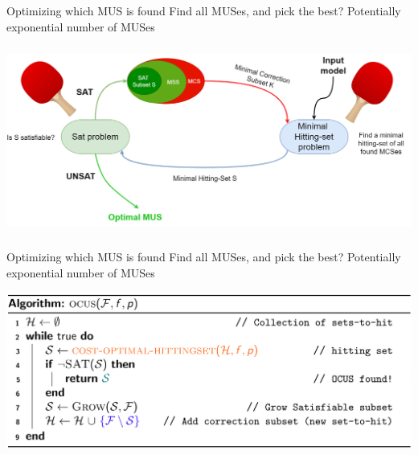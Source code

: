 \documentclass{cons-beamer}
\begin{document}
\begin{frame}{Optimizing which MUS is found}
  Find all MUSes, and pick the best? 
   Potentially exponential number of MUSes
  \vfill

  \begin{center}
    \includegraphics[height=62mm]{images/texpl_img/ocus.png}
  \end{center}
\end{frame}

\begin{frame}{Optimizing which MUS is found}
  Find all MUSes, and pick the best? 
   Potentially exponential number of MUSes
  \vfill

  \begin{center}
    \includegraphics[height=52mm]{images/texpl_img/ocus_algo.png}
  \end{center}
\end{frame}
\end{document}
